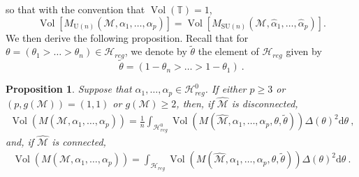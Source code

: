 \documentclass[11pt,a4paper]{amsart}
\providecommand{\diff}{\mathrm d}
\providecommand{\U}{\mathrm U}
\providecommand{\SU}{\mathrm {SU}}
\providecommand{\Vol}{\operatorname{Vol}}
\numberwithin{equation}{section}
\newtheorem{proposition}[theorem]{Proposition}
\theoremstyle{definition}
\begin{document}
so that with the convention that $\Vol(\mathbb{T})=1$, 
\begin{equation}\label{eq:SU_n_equal_Un}
\Vol \left[M_{\U(n)}\left(\mathcal{M},\alpha_1,\ldots,\alpha_{p}\right)\right] = 
\Vol \left[M_{\SU(n)}(\mathcal{M}, \hat{\alpha}_1,\ldots,\hat{\alpha}_{p})\right] .
\end{equation}
We then derive the following proposition. Recall that for $\theta = (\theta_1 > \dots > \theta_n) \in \mathcal{H}_{reg}$, 
we denote by $\tilde{\theta}$ the element of $\mathcal{H}_{reg}$ given by 
\begin{equation*}
    \tilde{\theta} = (1 - \theta_n > \dots > 1 - \theta_1) \ .
\end{equation*}

\begin{proposition}\label{prop:volume_formula_flat}
Suppose that $\alpha_1,\ldots,\alpha_p\in \mathcal{H}_{reg}^0$. If either $p\geqslant 3$ or $(p,g(\mathcal{M}))=(1, 1)$ 
or $g(\mathcal{M})\geqslant 2$, then, if $\widehat{\mathcal{M}}$ is disconnected, 
\begin{align*}
\Vol(M(\mathcal{M},\alpha_1,\ldots,\alpha_p)) = 
\frac{1}{n}\int_{\mathcal{H}_{reg}^0} 
\Vol(M(\widehat{\mathcal{M}},\alpha_1,\ldots,\alpha_p,\theta,\tilde{\theta}))\Delta(\theta)^2 \diff \theta \ ,
\end{align*}
and, if $\widehat{\mathcal{M}}$ is connected,
\begin{align*}
\Vol(M(\mathcal{M},\alpha_1,\ldots,\alpha_p))=\int_{\mathcal{H}_{reg}}\Vol(M(\widehat{\mathcal{M}}, 
\alpha_1,\ldots,\alpha_p,\theta,\tilde{\theta}))\Delta(\theta)^2 \diff \theta \ .
\end{align*}
\end{proposition}
\end{document}
